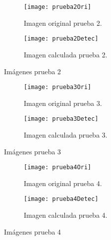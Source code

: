 \begin{figure}
	\begin{subfigure}[c]{.5\linewidth}
	\centering\large \texttt{[image: prueba2Ori]}
	\caption{Imagen original prueba 2.}\label{fig:orip2}
	\end{subfigure}%
	\begin{subfigure}[c]{.5\linewidth}
	\centering\large \texttt{[image: prueba2Detec]}
	\caption{Imagen calculada prueba 2.}\label{fig:calcp2}
	\end{subfigure}%
	\caption{Imágenes prueba 2}
	\label{fig:p2}

\end{figure}


\begin{figure}
	\begin{subfigure}[c]{.5\linewidth}
	\centering\large \texttt{[image: prueba3Ori]}
	\caption{Imagen original prueba 3.}\label{fig:orip3}
	\end{subfigure}%
	\begin{subfigure}[c]{.5\linewidth}
	\centering\large \texttt{[image: prueba3Detec]}
	\caption{Imagen calculada prueba 3.}\label{fig:calcp3}
	\end{subfigure}%
	\caption{Imágenes prueba 3}
	\label{fig:p3}

\end{figure}



\begin{figure}
	\begin{subfigure}[c]{.5\linewidth}
	\centering\large \texttt{[image: prueba4Ori]}
	\caption{Imagen original prueba 4.}\label{fig:orip4} 
	\end{subfigure}%
	\begin{subfigure}[c]{.5\linewidth}
	\centering\large \texttt{[image: prueba4Detec]}
	\caption{Imagen calculada prueba 4.}\label{fig:calcp4}
	\end{subfigure}%
	\caption{Imágenes prueba 4}
	\label{fig:p4}

\end{figure}
